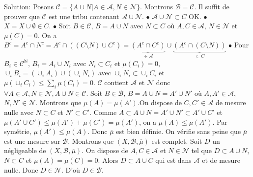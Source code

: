 \documentclass{report}
\begin{document}
Solution: Posons $\mathcal C = \{A\cup N| A\in \mathcal A, N\in \mathcal N\}$.  Montrons $\mathcal B = \mathcal C$.\newline
\fbox{$\subset$} Il suffit de prouver que $\mathcal C$ est une tribu contenant $\mathcal A \cup \mathcal N$. \newline
$\bullet$ $\mathcal A \cup \mathcal N \subset C$ \quad OK.\newline
$\bullet$ $X = X\cup \emptyset \in C$.\newline
$\bullet$ Soit $B\in \mathcal C$, $B= A\cup N$ avec $N\subset C$ où $A,C\in \mathcal A$, $N\in \mathcal N$ et $\mu(C)=0$.\newline
On a $B^c = A^c \cap N^c = A^c \cap ((C\setminus N) \cup C^c) = \underbrace{(A^c \cap C^c)}_{\in \mathcal A}\cup \underbrace{(A^c \cap (C\setminus N))}_{\subset C}$\newline
$\bullet$ Pour $B_i\in \mathcal C^{\mathbb N}$, $B_i = A_i \cup N_i$ avec $N_i\subset C_i$ et $\mu(C_i)=0$, \newline
$\cup_i B_i = (\cup_i A_i) \cup (\cup_i N_i) $ avec $\cup_i N_i \subset \cup_i C_i$ et $\mu(\cup_i C_i)\leq \sum_i \mu(C_i) = 0$.\newline
\fbox{$\supset$} $\mathcal C$ contient $\mathcal A$ et $\mathcal N$ donc $\forall A\in \mathcal A, N\in \mathcal N, A\cup N \in \mathcal C.$ \newline \newline
Soit $B\in\mathcal B$, $B=A\cup N=A' \cup N'$ où $A,A'\in \mathcal A$, $N,N'\in\mathcal N$. Montrons que $\mu(A)=\mu(A')$.\newline On dispose de $C,C'\in \mathcal A$ de mesure nulle avec $N\subset C$ et $N'\subset C'$. Comme $A\subset A\cup N = A'\cup N'\subset A'\cup C'$ et $\mu(A'\cup C')\leq \mu(A')+\mu(C') = \mu(A')$, on a $\mu(A)\leq \mu(A')$. Par symétrie, $\mu(A')\leq \mu(A)$. Donc $\overline \mu$ est bien définie.\newline \newline
On vérifie sans peine que $\overline \mu$ est une mesure sur $\mathcal B$.\newline
Montrons que $(X,\mathcal B, \overline \mu)$ est complet. Soit $D$ un négligeable de $(X,\mathcal B, \overline \mu)$. On dispose de $A, C\in \mathcal A$ et $N\in \mathcal N$ tel que $D\subset A\cup N$, $N\subset C$ et $\mu(A)=\mu(C)=0$. Alors $D\subset A\cup C$ qui est dans $\mathcal A$ et de mesure nulle. Donc $D\in \mathcal N$. D'où $D\in \mathcal B$.\newline \newline
\end{document}
